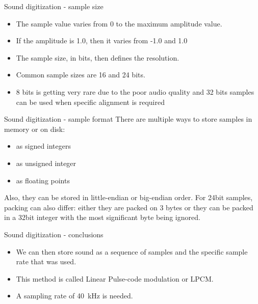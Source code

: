 \begin{frame}{Sound digitization - sample size}
  \begin{itemize}
  \item The sample value varies from 0 to the maximum amplitude value.
  \item If the amplitude is 1.0, then it varies from -1.0 and 1.0
  \item The sample size, in bits, then defines the resolution.
  \item Common sample sizes are 16 and 24 bits.
  \item 8 bits is getting very rare due to the poor audio quality and
    32 bits samples can be used when specific alignment is required
  \end{itemize}
\end{frame}

\begin{frame}{Sound digitization - sample format}
  There are multiple ways to store samples in memory or on disk:
  \begin{itemize}
  \item as signed integers
  \item as unsigned integer
  \item as floating points
  \end{itemize}
  Also, they can be stored in little-endian or big-endian order.
  For 24bit samples, packing can also differ: either they are packed
  on 3 bytes or they can be packed in a 32bit integer with the most
  significant byte being ignored.
\end{frame}

\begin{frame}{Sound digitization - conclusions}
  \begin{itemize}
  \item We can then store sound as a sequence of samples and the
    specific sample rate that was used.
  \item This method is called Linear Pulse-code modulation or LPCM.
  \item A sampling rate of 40~kHz is needed.
  \end{itemize}
\end{frame}

